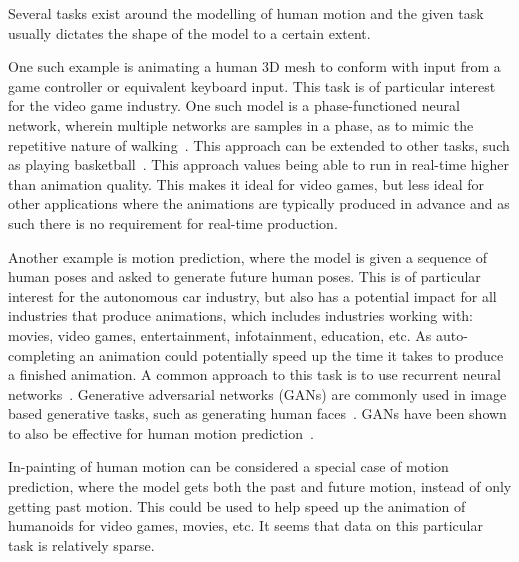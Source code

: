 Several tasks exist around the modelling of human motion and the given task usually dictates the shape of the model to a certain extent.

One such example is animating a human 3D mesh to conform with input from a game controller or equivalent keyboard input.
This task is of particular interest for the video game industry.
One such model is a phase-functioned neural network, wherein multiple networks are samples in a phase, as to mimic the repetitive nature of walking~\cite{holden2017}.
This approach can be extended to other tasks, such as playing basketball~\cite{starke2020}.
This approach values being able to run in real-time higher than animation quality.
This makes it ideal for video games, but less ideal for other applications where the animations are typically produced in advance and as such there is no requirement for real-time production.

Another example is motion prediction, where the model is given a sequence of human poses and asked to generate future human poses.
This is of particular interest for the autonomous car industry, but also has a potential impact for all industries that produce animations, which includes industries working with: movies, video games, entertainment, infotainment, education, etc.
As auto-completing an animation could potentially speed up the time it takes to produce a finished animation.
A common approach to this task is to use recurrent neural networks~\cite{hu2020predicting,jain2016structuralrnn}.
Generative adversarial networks (GANs) are commonly used in image based generative tasks, such as generating human faces~\cite{karras2019stylebased}.
GANs have been shown to also be effective for human motion prediction~\cite{ruiz2019human}.

In-painting of human motion can be considered a special case of motion prediction, where the model gets both the past and future motion, instead of only getting past motion.
This could be used to help speed up the animation of humanoids for video games, movies, etc.
It seems that data on this particular task is relatively sparse.
